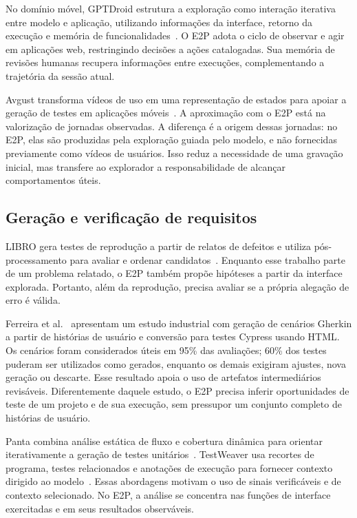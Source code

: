 \documentclass[12pt]{article}
\begin{document}
No domínio móvel, GPTDroid estrutura a exploração como interação iterativa entre modelo e aplicação, utilizando informações da interface, retorno da execução e memória de funcionalidades~\cite{liu2024gptdroid}. O E2P adota o ciclo de observar e agir em aplicações web, restringindo decisões a ações catalogadas. Sua memória de revisões humanas recupera informações entre execuções, complementando a trajetória da sessão atual.

Avgust transforma vídeos de uso em uma representação de estados para apoiar a geração de testes em aplicações móveis~\cite{zhao2022avgust}. A aproximação com o E2P está na valorização de jornadas observadas. A diferença é a origem dessas jornadas: no E2P, elas são produzidas pela exploração guiada pelo modelo, e não fornecidas previamente como vídeos de usuários. Isso reduz a necessidade de uma gravação inicial, mas transfere ao explorador a responsabilidade de alcançar comportamentos úteis.

\subsection{Geração e verificação de requisitos}
LIBRO gera testes de reprodução a partir de relatos de defeitos e utiliza pós-processamento para avaliar e ordenar candidatos~\cite{kang2023libro}. Enquanto esse trabalho parte de um problema relatado, o E2P também propõe hipóteses a partir da interface explorada. Portanto, além da reprodução, precisa avaliar se a própria alegação de erro é válida.

Ferreira et al.~\cite{ferreira2025acceptance} apresentam um estudo industrial com geração de cenários Gherkin a partir de histórias de usuário e conversão para testes Cypress usando HTML. Os cenários foram considerados úteis em 95\% das avaliações; 60\% dos testes puderam ser utilizados como gerados, enquanto os demais exigiram ajustes, nova geração ou descarte. Esse resultado apoia o uso de artefatos intermediários revisáveis. Diferentemente daquele estudo, o E2P precisa inferir oportunidades de teste de um projeto e de sua execução, sem pressupor um conjunto completo de histórias de usuário.

Panta combina análise estática de fluxo e cobertura dinâmica para orientar iterativamente a geração de testes unitários~\cite{gu2026panta}. TestWeaver usa recortes de programa, testes relacionados e anotações de execução para fornecer contexto dirigido ao modelo~\cite{le2026testweaver}. Essas abordagens motivam o uso de sinais verificáveis e de contexto selecionado. No E2P, a análise se concentra nas funções de interface exercitadas e em seus resultados observáveis.
\end{document}
